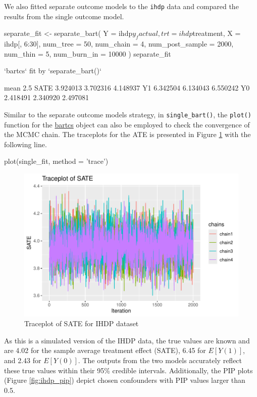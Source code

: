 We also fitted separate outcome models to the \verb|ihdp| data and compared the results from the single outcome model.
\begin{example}
separate_fit <- separate_bart(
     Y               = ihdp$y_factual,
     trt             = ihdp$treatment,
     X               = ihdp[, 6:30],
     num_tree        = 50,
     num_chain       = 4,
     num_post_sample = 2000,
     num_thin        = 5, 
     num_burn_in     = 10000
   )
separate_fit

`bartcs` fit by `separate_bart()`

         mean     2.5%
SATE 3.924013 3.702316 4.148937
Y1   6.342504 6.134043 6.550242
Y0   2.418491 2.340920 2.497081
\end{example}

Similar to the separate outcome models strategy, in \verb|single_bart()|, the \verb|plot()| function for the \href{https://CRAN.R-project.org/package=bartcs}{bartcs} object can also be employed to check the convergence of the MCMC chain. The traceplots for the ATE is presented in Figure \ref{fig:ihdp_trace} with the following line.

\begin{example}
plot(single_fit, method = 'trace')
\end{example}

\begin{figure}[htbp]
\centering
\includegraphics[width=0.6\linewidth]{fig/ihdp_trace_ATE.pdf}
\caption{Traceplot of SATE for IHDP dataset}\label{fig:ihdp_trace}
\end{figure}







As this is a simulated version of the IHDP data, the true values are known and are 4.02 for the sample average treatment effect (SATE), 6.45 for $E[Y(1)]$, and 2.43 for $E[Y(0)]$. The outputs from the two models accurately reflect these true values within their 95\% credible intervals. Additionally, the PIP plots (Figure \ref{fig:ihdp_pip}) depict chosen confounders with PIP values larger than 0.5.


